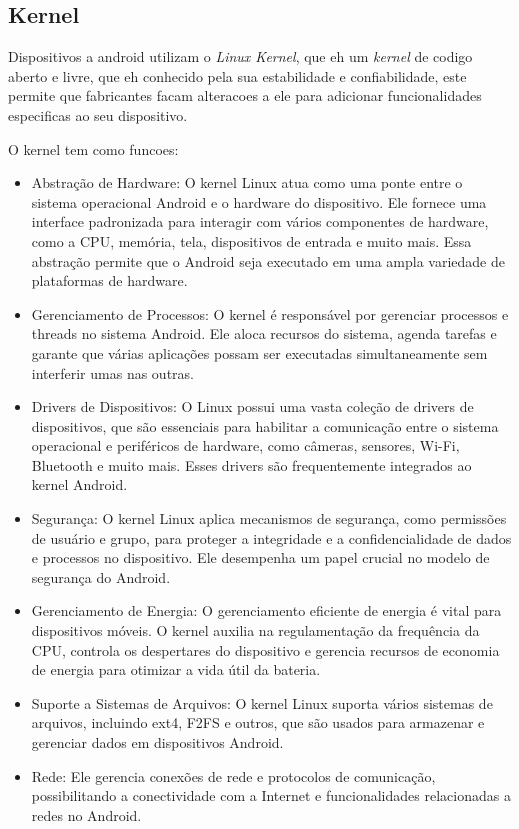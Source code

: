\subsection{Kernel}

Dispositivos a android utilizam o \emph{Linux Kernel}, que eh um \emph{kernel} de codigo aberto e livre, que eh conhecido pela sua estabilidade e confiabilidade, este permite que fabricantes facam alteracoes a ele para adicionar funcionalidades especificas ao seu dispositivo.

O kernel tem como funcoes:

\begin{itemize}
    \item Abstração de Hardware: O kernel Linux atua como uma ponte entre o sistema operacional Android e o hardware do dispositivo. Ele fornece uma interface padronizada para interagir com vários componentes de hardware, como a CPU, memória, tela, dispositivos de entrada e muito mais. Essa abstração permite que o Android seja executado em uma ampla variedade de plataformas de hardware.
    \item Gerenciamento de Processos: O kernel é responsável por gerenciar processos e threads no sistema Android. Ele aloca recursos do sistema, agenda tarefas e garante que várias aplicações possam ser executadas simultaneamente sem interferir umas nas outras.
    \item Drivers de Dispositivos: O Linux possui uma vasta coleção de drivers de dispositivos, que são essenciais para habilitar a comunicação entre o sistema operacional e periféricos de hardware, como câmeras, sensores, Wi-Fi, Bluetooth e muito mais. Esses drivers são frequentemente integrados ao kernel Android.
    \item Segurança: O kernel Linux aplica mecanismos de segurança, como permissões de usuário e grupo, para proteger a integridade e a confidencialidade de dados e processos no dispositivo. Ele desempenha um papel crucial no modelo de segurança do Android.
    \item Gerenciamento de Energia: O gerenciamento eficiente de energia é vital para dispositivos móveis. O kernel auxilia na regulamentação da frequência da CPU, controla os despertares do dispositivo e gerencia recursos de economia de energia para otimizar a vida útil da bateria.
    \item Suporte a Sistemas de Arquivos: O kernel Linux suporta vários sistemas de arquivos, incluindo ext4, F2FS e outros, que são usados para armazenar e gerenciar dados em dispositivos Android.
    \item Rede: Ele gerencia conexões de rede e protocolos de comunicação, possibilitando a conectividade com a Internet e funcionalidades relacionadas a redes no Android.
\end{itemize}

